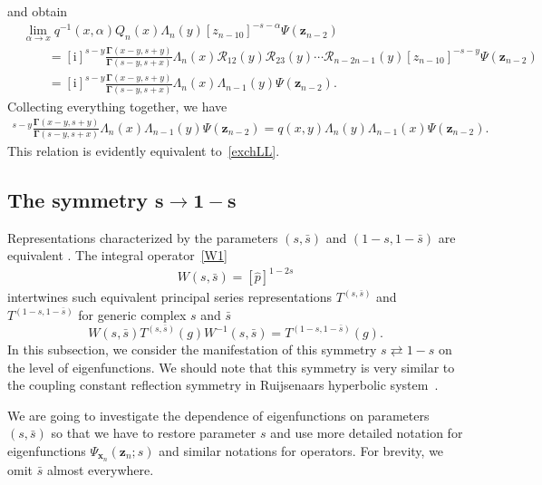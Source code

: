 \documentclass[10pt,a4paper]{amsart}
\renewcommand{\imath}{\mathrm{i}}
\numberwithin{equation}{section}
\begin{document}
and obtain
\begin{align*}
&
\lim\limits_{\alpha\to x}
q^{-1}(x,\alpha) Q_n(x) \Lambda_n(y)
[z_{n-1 0}]^{-s-\alpha} \Psi(\bm z_{n-2}) \\
&
\qquad =
[\imath]^{s-y} \frac{\mathbf{\Gamma}(x-y,s+y)}
{\mathbf{\Gamma}(s-y,s+x)} \Lambda_n(x) \mathcal{R}_{12}(y)\mathcal{R}_{23}(y)\cdots
\mathcal{R}_{n-2 n-1}(y) [z_{n-1 0}]^{-s-y} \Psi(\bm z_{n-2}) \\
&
\qquad =
[\imath]^{s-y} \frac{\mathbf{\Gamma}(x-y,s+y)}
{\mathbf{\Gamma}(s-y,s+x)}
\Lambda_n(x) \Lambda_{n-1}(y) \Psi(\bm z_{n-2}) .
\end{align*}
Collecting everything together, we have
\begin{align*}
[\imath]^{s-y} \frac{\mathbf{\Gamma}(x-y,s+y)}
{\mathbf{\Gamma}(s-y,s+x)}
\Lambda_n(x) \Lambda_{n-1}(y) \Psi(\bm z_{n-2}) = q(x,y) \Lambda_{n}(y) \Lambda_{n-1}(x) \Psi(\bm z_{n-2}) .
\end{align*}
This relation is evidently equivalent to~\eqref{exchLL}.


\subsection[The symmetry s to 1-s]{The symmetry $\boldsymbol{s \to 1-s}$} \label{sect:SpinSym}

Representations characterized by the
parameters $(s, \bar s)$ and $(1-s, 1-\bar{s})$ are equivalent \cite{GGV, GN}.
The integral operator~\eqref{W1}
\begin{align*}
W(s,\bar{s}) = [\hat{p}]^{1-2s}
\end{align*}
intertwines such equivalent principal series representations $T^{(s,\bar{s})}$
and $T^{(1-s,1-\bar{s})}$ for generic complex $s$ and $\bar{s}$
\begin{equation}
\label{splet1}
W(s,\bar{s}) T^{(s,\bar{s})}(g) W^{-1}(s,\bar{s}) =
T^{(1-s,1-\bar{s})}(g) .
\end{equation}
In this subsection, we consider the manifestation of this
symmetry $s \rightleftarrows 1-s$ on the level of eigenfunctions.
We should note that this symmetry is very similar to the
coupling constant reflection symmetry in Ruijsenaars hyperbolic
system~\cite{BDKK4}.

We are going to investigate the dependence of eigenfunctions
on parameters $(s, \bar s)$ so that we have to restore
parameter $s$ and use more detailed notation for eigenfunctions
$\Psi_{\bm x_n}(\bm z_n;s)$ and similar notations for operators.
For brevity, we omit $\bar{s}$ almost everywhere.
\end{document}
